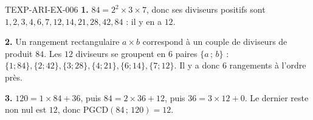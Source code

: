 \begin{corrige}{TEXP-ARI-EX-006}
\textbf{1.} $84=2^2\times3\times7$, donc ses diviseurs positifs sont
$1,2,3,4,6,7,12,14,21,28,42,84$ : il y en a $12$.

\textbf{2.} Un rangement rectangulaire $a\times b$ correspond à un couple de
diviseurs de produit $84$. Les $12$ diviseurs se groupent en $6$ paires
$\{a\,;\,b\}$ : $\{1;84\},\{2;42\},\{3;28\},\{4;21\},\{6;14\},\{7;12\}$.
Il y a donc $6$ rangements à l'ordre près.

\textbf{3.} $120=1\times84+36$, puis $84=2\times36+12$, puis $36=3\times12+0$.
Le dernier reste non nul est $12$, donc $\mathrm{PGCD}(84\,;\,120)=12$.
\end{corrige}

